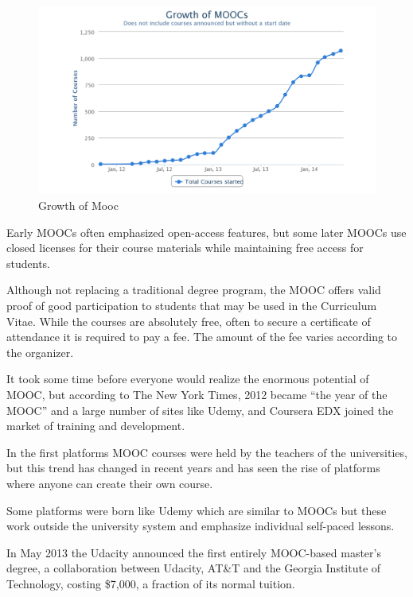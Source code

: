 \begin{figure}[htb] %
 \centering
 \includegraphics[width=0.8\linewidth]{images/chapter1/mooc.jpg}\hfill
 \caption[Growth of Mooc]{Growth of Mooc}
 \label{fig:fourV}
\end{figure}


Early MOOCs often emphasized open-access features, but some later MOOCs use closed licenses for their course materials while maintaining free access for students.\cite{mooc_wiki}

Although not replacing a traditional degree program, the MOOC offers valid proof of good participation to students that may be used in the Curriculum Vitae. While the courses are absolutely free, often to secure a certificate of attendance it is required to pay a fee. The amount of the fee varies according to the organizer.


It took some time before everyone would realize the enormous potential of MOOC, but according to The New York Times, 2012 became “the year of the MOOC”\cite{pappano2012year} and a large number of sites like Udemy, and Coursera EDX joined the market of training and development.

In the first platforms MOOC courses were held by the teachers of the universities, but this trend has changed in recent years and has seen the rise of platforms where anyone can create their own course.

Some platforms were born like Udemy which are similar to MOOCs but these work outside the university system and emphasize individual self-paced lessons.

In May 2013 the Udacity announced the first entirely MOOC-based master's degree, a collaboration between Udacity, AT\&T and the Georgia Institute of Technology, costing \$7,000, a fraction of its normal tuition.\cite{mooc_wiki}

